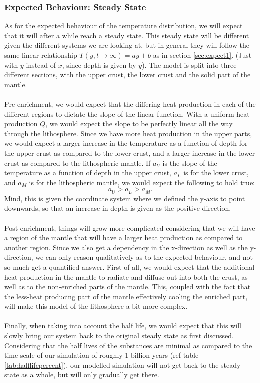 \documentclass[reprint,english,notitlepage]{revtex4-1}  %
\begin{document}
\subsubsection{Expected Behaviour: Steady State}

As for the expected behaviour of the temperature distribution, we will expect that it will after a while reach a steady state. This steady state will be different given the different systems we are looking at, but in general they will follow the same linear relationship $T(y,t\rightarrow\infty) = ay+b$ as in section \ref{sec:expect1}. (Just with $y$ instead of $x$, since depth is given by $y$). The model is split into three different sections, with the upper crust, the lower crust and the solid part of the mantle.
\\
\\
Pre-enrichment, we would expect that the differing heat production in each of the different regions to dictate the slope of the linear function. With a uniform heat production $Q$, we would expect the slope to be perfectly linear all the way through the lithosphere. Since we have more heat production in the upper parts, we would expect a larger increase in the temperature as a function of depth for the upper crust as compared to the lower crust, and a larger increase in the lower crust as compared to the lithospheric mantle. If $a_{U}$ is the slope of the temperature as a function of depth in the upper crust, $a_{L}$ is for the lower crust, and $a_{M}$ is for the lithospheric mantle, we would expect the following to hold true:
\begin{equation}
    a_U > a_L > a_M.
\end{equation}
Mind, this is given the coordinate system where we defined the y-axis to point downwards, so that an increase in depth is given as the positive direction.
\\
\\
Post-enrichment, things will grow more complicated considering that we will have a region of the mantle that will have a larger heat production as compared to another region. Since we also get a dependency in the x-direction as well as the y-direction, we can only reason qualitatively as to the expected behaviour, and not so much get a quantified answer. First of all, we would expect that the additional heat production in the mantle to radiate and diffuse out into both the crust, as well as to the non-enriched parts of the mantle. This, coupled with the fact that the less-heat producing part of the mantle effectively cooling the enriched part, will make this model of the lithosphere a bit more complex.
\\
\\
Finally, when taking into account the half life, we would expect that this will slowly bring our system back to the original steady state as first discussed. Considering that the half lives of the substances are minimal as compared to the time scale of our simulation of roughly 1 billion years (ref table \ref{tab:halflifepercent}), our modelled simulation will not get back to the steady state as a whole, but will only gradually get there.
\end{document}
